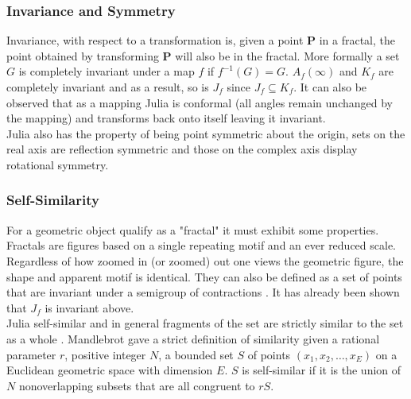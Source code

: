 \documentclass[12pt]{article}
\begin{document}
{\parindent0pt
\subsubsection{Invariance and Symmetry }
Invariance, with respect to a transformation is, given a point $\mathbf{P}$ in a fractal,  the point obtained by transforming $\mathbf{P}$ will also be in the fractal.\cite{hans} More formally a set $G$ is completely invariant under a map $f$ if $f^{-1} (G) = G$. \cite{solomak} $A_f(\infty)$  and $K_f$ are completely invariant and as a result, so is $J_f$ since $J_f \subseteq K_f$.  It can also be observed that as a mapping Julia is conformal (all angles remain unchanged by the mapping) and transforms back onto itself\cite{hans} leaving it invariant. \\

Julia also has the property of being point symmetric about the origin\cite{hans}, sets on the real axis are reflection symmetric and those on the complex axis display rotational symmetry.\cite{hypertext} 

\subsubsection{Self-Similarity}
For a geometric object qualify as a "fractal" it must exhibit some properties. Fractals are figures based on a single repeating motif and an ever reduced scale.\cite{hans} Regardless of how zoomed in (or zoomed) out one views the geometric figure, the shape and apparent motif is identical. They can also be defined as a set of points that are invariant under a semigroup of contractions \cite{hans}. It has already been shown that $J_f$ is invariant above.  \\

Julia self-similar \cite{Frame} and in general fragments of the set are strictly similar to the set as a whole \cite{hypertext}. Mandlebrot gave a strict definition of similarity \cite{goodwin} given a rational parameter $r$, positive integer $N$, a bounded set $S$ of points  $(x_1,x_2, \hdots, x_E)$ on a Euclidean geometric space with dimension $E$. $S$ is self-similar if it is the union of $N$ nonoverlapping subsets that are all congruent to $rS$.

}
\end{document}
